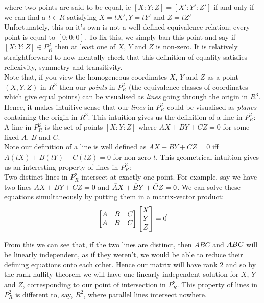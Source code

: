\documentclass{article}
\begin{document}
where two points are said to be equal, ie $[X : Y : Z] = [X' : Y' : Z']$ if and only if we can find a $t \in R$ satisfying $X = tX', Y =  tY'$ and $Z = tZ'$\\

Unfortunately, this on it's own is not a well-defined equivalence relation; every point is equal to $[0 : 0 : 0]$. To fix this, we simply ban this point and say if  $[X : Y : Z] \in P_R^2$  then at least one of $X$, $Y$ and $Z$ is non-zero. It is relatively straightforward to now mentally check that this definition of equality satisfies reflexivity, symmetry and transitivity.\\

Note that, if you view the homogeneous coordinates $X$, $Y$ and $Z$ as a point $(X, Y, Z)$ in $R^3$ then our \emph{points} in $P_R^2$ (the equivalence classes of coordinates which give equal points) can be visualised as \emph{lines} going through the origin in $R^3$. Hence, it makes intuitive sense that our \emph{lines} in $P_R^2$ could be visualised as \emph{planes} containing the origin in $R^3$. This intuition gives us the definition of a line in $P_R^2$:\\

A line in $P_R^2$ is the set of points $[X : Y : Z]$ where $AX + BY + CZ = 0$ for some fixed $A$, $B$ and $C$. \\

Note our definition of a line is well defined as  $AX + BY + CZ = 0$ iff  $A(tX) + B(tY) + C(tZ) = 0$ for non-zero $t$. This geometrical intuition gives us an interesting property of lines in $P_R^2$: \\

Two distinct lines in $P_R^2$ intersect at exactly one point. For example, say we have two lines $AX + BY + CZ = 0$ and $\Bar{A}X + \bar{B}Y + \bar{C}Z = 0$. We can solve these equations simultaneously by putting them in a matrix-vector product:\\

$$ \begin{bmatrix}
A & B & C \\
\Bar{A} & \Bar{B} & \Bar{C} 
\end{bmatrix} 
\begin{bmatrix}
X \\
Y \\
Z \\
\end{bmatrix} 
= \vec{0}
$$

From this we can see that, if the two lines are distinct, then $A  B  C$ and
$\Bar{A}  \Bar{B}  \Bar{C} $ will be linearly independent, as if they weren't, we would be able to reduce their defining equations onto each other. Hence our matrix will have rank 2 and so by the rank-nullity theorem we will have one linearly independent solution for $X$, $Y$ and $Z$, corresponding to our point of intersection in $P_R^2$. This property of lines in $P_R^2$ is different to, say, $R^2$, where parallel lines intersect nowhere.\\
\end{document}
